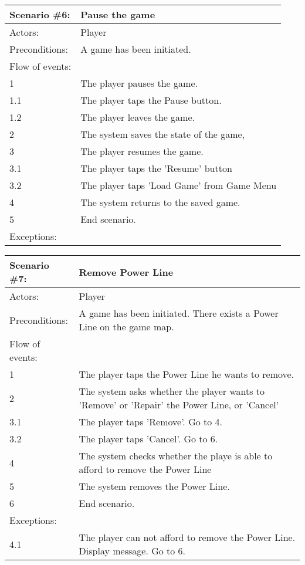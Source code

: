 \begin{tabular}{| l | p{10cm} |}
	\hline
	\rowcolor{lightgray}
	{\bf Scenario \#6:} & {\bf Pause the game} \\ \hline
	Actors: & Player \\ \hline
	Preconditions: & A game has been initiated. \\ \hline
	Flow of events: & \\ \hline
	1 & The player pauses the game. \\ \hline
	1.1 & The player taps the Pause button. \\ \hline
	1.2 & The player leaves the game. \\ \hline
	2 & The system saves the state of the game, \\ \hline
	3 & The player resumes the game. \\ \hline
	3.1 & The player taps the 'Resume' button \\ \hline
	3.2 & The player taps 'Load Game' from Game Menu \\ \hline
	4 & The system returns to the saved game. \\ \hline
	5 & End scenario. \\ \hline
	Exceptions: & \\ \hline
\end{tabular}

\begin{tabular}{| l | p{10cm} |}
	\hline
	\rowcolor{lightgray}
	{\bf Scenario \#7:} & {\bf Remove Power Line} \\ \hline
	Actors: & Player \\ \hline
	Preconditions: & A game has been initiated. There exists a Power Line on the game map. \\ \hline
	Flow of events: & \\ \hline
	1 & The player taps the Power Line he wants to remove. \\ \hline
	2 & The system asks whether the player wants to 'Remove' or 'Repair' the Power Line, or 'Cancel' \\ \hline
	3.1 & The player taps 'Remove'. Go to 4. \\ \hline
	3.2 & The player taps 'Cancel'. Go to 6. \\ \hline
	4 & The system checks whether the playe is able to afford to remove the Power Line \\ \hline
	5 & The system removes the Power Line. \\ \hline
	6 & End scenario. \\ \hline
	Exceptions: & \\ \hline
	4.1 & The player can not afford to remove the Power Line. Display message. Go to 6. \\ \hline
\end{tabular}

